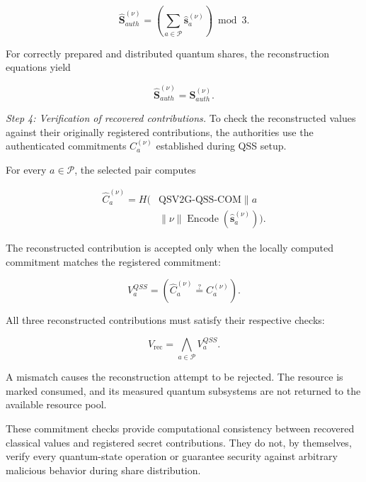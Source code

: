 \documentclass[twocolumn,10pt,journal]{IEEEtran}
\begin{document}
\begin{equation}
\widehat{\mathbf{S}}_{auth}^{(\nu)}
=
\left(
\sum_{a\in\mathcal{P}}
\widehat{\mathbf{s}}_a^{(\nu)}
\right)\bmod 3.
\label{eq:qsv2g_reconstructed_secret}
\end{equation}

For correctly prepared and distributed quantum
shares, the reconstruction equations yield

\begin{equation}
\widehat{\mathbf{S}}_{auth}^{(\nu)}
=
\mathbf{S}_{auth}^{(\nu)}.
\label{eq:qsv2g_qss_correctness}
\end{equation}

\textit{Step 4: Verification of recovered contributions.}
To check the reconstructed values against their
originally registered contributions, the authorities
use the authenticated commitments
$C_a^{(\nu)}$ established during QSS setup.

For every $a\in\mathcal{P}$, the selected pair
computes

\begin{equation}
\begin{aligned}
\widehat{C}_a^{(\nu)}
=
H\big(
&\mathrm{QSV2G\mbox{-}QSS\mbox{-}COM}
\parallel a\\
&\parallel\nu
\parallel
\operatorname{Encode}
(\widehat{\mathbf{s}}_a^{(\nu)})
\big).
\end{aligned}
\label{eq:qsv2g_reconstructed_commitment}
\end{equation}

The reconstructed contribution is accepted only
when the locally computed commitment matches
the registered commitment:

\begin{equation}
V_a^{QSS}
=
\left(
\widehat{C}_a^{(\nu)}
\stackrel{?}{=}
C_a^{(\nu)}
\right).
\label{eq:qsv2g_qss_commitment_check}
\end{equation}

All three reconstructed contributions must satisfy
their respective checks:

\begin{equation}
V_{\mathrm{rec}}
=
\bigwedge_{a\in\mathcal{P}}
V_a^{QSS}.
\label{eq:qsv2g_qss_reconstruction_valid}
\end{equation}

A mismatch causes the reconstruction attempt
to be rejected. The resource is marked consumed,
and its measured quantum subsystems are not
returned to the available resource pool.

These commitment checks provide computational
consistency between recovered classical values
and registered secret contributions. They do
not, by themselves, verify every quantum-state
operation or guarantee security against arbitrary
malicious behavior during share distribution.
\end{document}
